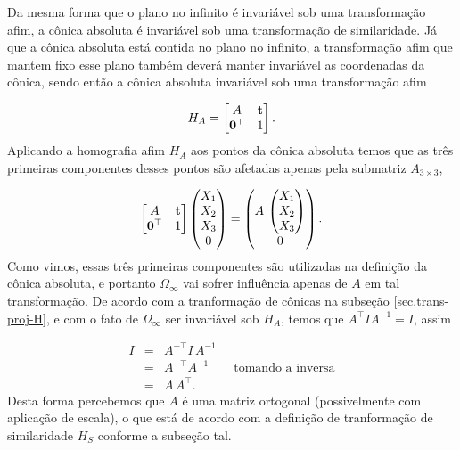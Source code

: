 Da mesma forma que o plano no infinito é invariável sob uma transformação afim, a cônica absoluta é invariável sob uma transformação de similaridade. Já que a cônica absoluta está contida no plano no infinito, a transformação afim que mantem fixo esse plano também deverá manter invariável as coordenadas da cônica, sendo então a cônica absoluta invariável sob uma transformação afim

\begin{equation*}
H_A=
\begin{bmatrix}
A&{\bf t}\\
{\bf 0}^\top&1
\end{bmatrix}.
\end{equation*}
Aplicando a homografia afim $H_A$ aos pontos da cônica absoluta temos que as três primeiras componentes desses pontos são afetadas apenas pela submatriz $A_{3\times3}$,

\begin{equation*}
\begin{bmatrix}
A&{\bf t}\\
{\bf 0}^\top&1
\end{bmatrix}
\begin{pmatrix}
X_1\\
X_2\\
X_3\\
0
\end{pmatrix}
=
\begin{pmatrix}
A\,
\begin{pmatrix}
X_1\\
X_2\\
X_3
\end{pmatrix}\\
0
\end{pmatrix}.
\end{equation*}
Como vimos, essas três primeiras componentes são utilizadas na definição da cônica absoluta, e portanto $\Omega_\infty$ vai sofrer influência apenas de $A$ em tal transformação. 
De acordo com a tranformação de cônicas na subseção \ref{sec.trans-proj-H}, e com o fato de $\Omega_\infty$ ser invariável sob 
$H_A$, temos que $A^\top I A^{-1}=I$, assim

\begin{equation*}
\begin{array}{rcl}
I&=&A^{-\top}I\,A^{-1}\\
&=&A^{-\top}A^{-1}\qquad\text{tomando a inversa}\\
&=&A\,A^\top.
\end{array}
\end{equation*}
Desta forma percebemos que $A$ é uma matriz ortogonal (possivelmente com aplicação de escala), o que está de acordo com a definição de tranformação de similaridade $H_S$ conforme a subseção tal.

